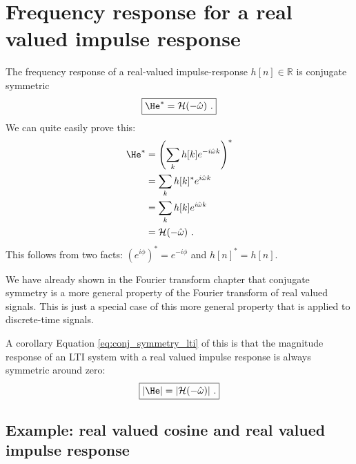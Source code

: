 \section{Frequency response for a real valued impulse response}

The frequency response of a real-valued impulse-response
$h[n]\in \mathbb{R}$ is conjugate symmetric
\begin{equation}
\boxed{
\He^* = \mathcal{H}(-\hat{\omega})\,\,.
}
\label{eq:conj_symmetry_lti}
\end{equation}
We can quite easily prove this:
\begin{align}
\He^* &= \left(\sum_k h[k] e^{-i\hat{\omega}k}\right)^* \\
        &= \sum_k h[k]^* e^{i\hat{\omega}k} \\
        &= \sum_k h[k] e^{i\hat{\omega}k} \\
        &= \mathcal{H}(-\hat{\omega})\,\,.
\end{align}
This follows from two facts: $(e^{i\phi})^* = e^{-i\phi}$ and $h[n]^*
= h[n]$.

We have already shown in the Fourier transform chapter that conjugate
symmetry is a more general property of the Fourier transform of real
valued signals. This is just a special case of this more general
property that is applied to discrete-time signals.

A corollary Equation \ref{eq:conj_symmetry_lti} of this is that the
magnitude response of an LTI system with a real valued impulse
response is always symmetric around zero:
\begin{equation}
\boxed{
|\He| = |\mathcal{H}(-\hat{\omega})|\,\,.
}
\end{equation}

\subsection{Example: real valued cosine and real valued impulse response}

